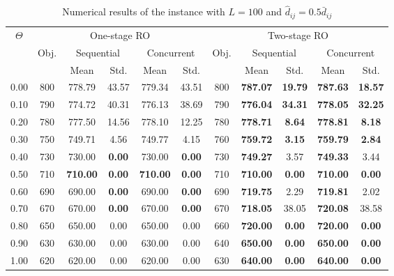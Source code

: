 \documentclass[preprint,review,10pt,round,authoryear]{elsarticle}\usepackage[]{graphicx}\usepackage[]{color}
\theoremstyle{plain}
\theoremstyle{definition}
\theoremstyle{remark}
\begin{document}
\begin{table*}[!ht]
\small
      \caption{Numerical results of the instance with $L=100$ and $\hat{d}_{ij}= 0.5\bar{d}_{ij} $}
      \begin{center}
      \begin{tabular}{||c| c| c| c| c| c| c| c| c|c|c||}
      \hline
      \hline
      \multirow{3}{*}{$\Theta$} &
      \multicolumn{5}{|c|}{One-stage RO} &
      \multicolumn{5}{|c||}{Two-stage RO} \\
      \cline{2-6}
      \cline{7-11}
      &\multirow{2}{*}{Obj.} &
      \multicolumn{2}{|c|}{Sequential} &
      \multicolumn{2}{|c|}{Concurrent} &
      \multirow{2}{*}{Obj.} &
      \multicolumn{2}{|c|}{Sequential} &
      \multicolumn{2}{|c||}{Concurrent}\\
      \cline{3-6}
      \cline{8-11}
      &&Mean&Std.&Mean&Std.&&Mean&Std.&Mean&Std.\\
      \hline%
  \hline
0.00 & 800 & 778.79 & 43.57 & 779.34 & 43.51 & 800 & \textbf{787.07} & \textbf{19.79} & \textbf{787.63} & \textbf{18.57} \\ 
   \hline
0.10 & 790 & 774.72 & 40.31 & 776.13 & 38.69 & 790 & \textbf{776.04} & \textbf{34.31} & \textbf{778.05} & \textbf{32.25} \\ 
   \hline
0.20 & 780 & 777.50 & 14.56 & 778.10 & 12.25 & 780 & \textbf{778.71} & \textbf{8.64} & \textbf{778.81} & \textbf{8.18} \\ 
   \hline
0.30 & 750 & 749.71 & 4.56 & 749.77 & 4.15 & 760 & \textbf{759.72} & \textbf{3.15 }& \textbf{759.79} & \textbf{2.84} \\ 
   \hline
0.40 & 730 & 730.00 & \textbf{0.00} & 730.00 & \textbf{0.00} & 730 & \textbf{749.27} & 3.57 & \textbf{749.33} & 3.44 \\ 
   \hline
0.50 & 710 &\textbf{ 710.00} & \textbf{0.00} & \textbf{710.00} & \textbf{0.00} & 710 & \textbf{710.00} & \textbf{0.00} & \textbf{710.00} & \textbf{0.00} \\ 
   \hline
0.60 & 690 & 690.00 & \textbf{0.00} & 690.00 & \textbf{0.00} & 690 & \textbf{719.75} & 2.29 & \textbf{719.81} & 2.02 \\ 
   \hline
0.70 & 670 & 670.00 & \textbf{0.00} & 670.00 & \textbf{0.00} & 670 & \textbf{718.05} & 38.05 & \textbf{720.08} & 38.58 \\ 
   \hline
0.80 & 650 & 650.00 & 0.00 & 650.00 & 0.00 & 660 & \textbf{720.00 }& \textbf{0.00} & \textbf{720.00} & \textbf{0.00} \\ 
   \hline
0.90 & 630 & 630.00 & 0.00 & 630.00 & 0.00 & 640 & \textbf{650.00} & \textbf{0.00} & \textbf{650.00} & \textbf{0.00} \\ 
   \hline
1.00 & 620 & 620.00 & 0.00 & 620.00 & 0.00 & 630 & \textbf{640.00} & \textbf{0.00} &\textbf{ 640.00} &\textbf{ 0.00} \\ 
  \hline
\hline
      \end{tabular}
      \end{center}
      \label{table:6}
      \end{table*}
\end{document}
